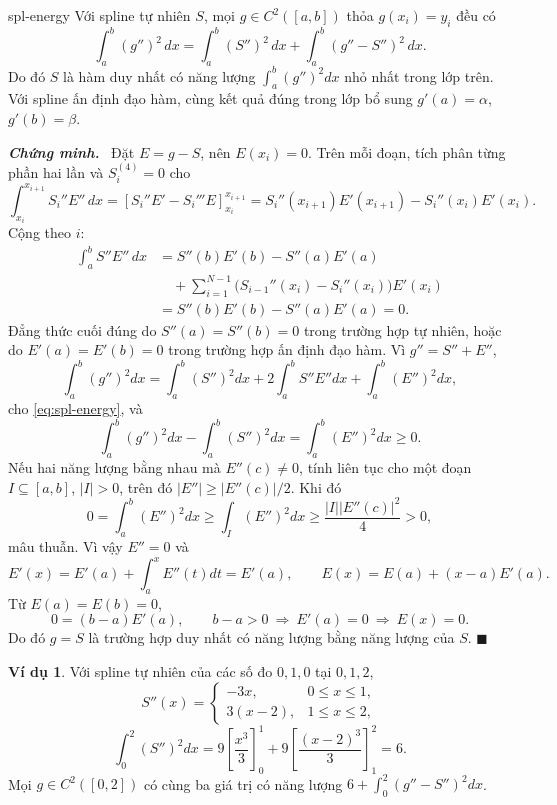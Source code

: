 \documentclass[12pt,a4paper,oneside]{book}
\numberwithin{algorithm}{chapter}
\theoremstyle{definition}
\newtheorem{vidu}{Ví dụ}[chapter]
\newenvironment{chungminh}{\par\medskip\noindent\textbf{\textit{\color{mainblue}Chứng minh.}}\ }{\hfill$\blacksquare$\par\medskip}
\begin{document}
\begin{dinhly}{}{spl-energy}
Với spline tự nhiên $S$, mọi $g\in C^2([a,b])$ thỏa $g(x_i)=y_i$ đều có
\begin{equation}\label{eq:spl-energy}
 \int_a^b(g'')^2\,dx
 =\int_a^b(S'')^2\,dx+\int_a^b(g''-S'')^2\,dx.
\end{equation}
Do đó $S$ là hàm duy nhất có năng lượng $\int_a^b(g'')^2dx$ nhỏ nhất trong lớp trên. Với spline ấn định đạo hàm, cùng kết quả đúng trong lớp bổ sung $g'(a)=\alpha$, $g'(b)=\beta$.
\end{dinhly}
\begin{chungminh}
Đặt $E=g-S$, nên $E(x_i)=0$. Trên mỗi đoạn, tích phân từng phần hai lần và $S_i^{(4)}=0$ cho
\[
 \int_{x_i}^{x_{i+1}}S_i''E''\,dx
 =[S_i''E'-S_i'''E]_{x_i}^{x_{i+1}}
 =S_i''(x_{i+1})E'(x_{i+1})-S_i''(x_i)E'(x_i).
\]
Cộng theo $i$:
\begin{align*}
 \int_a^bS''E''\,dx
 &=S''(b)E'(b)-S''(a)E'(a)\\
 &\quad+\sum_{i=1}^{N-1}
 \bigl(S_{i-1}''(x_i)-S_i''(x_i)\bigr)E'(x_i)\\
 &=S''(b)E'(b)-S''(a)E'(a)=0.
\end{align*}
Đẳng thức cuối đúng do $S''(a)=S''(b)=0$ trong trường hợp tự nhiên, hoặc do $E'(a)=E'(b)=0$ trong trường hợp ấn định đạo hàm. Vì $g''=S''+E''$,
\[
 \int_a^b(g'')^2dx=\int_a^b(S'')^2dx+2\int_a^bS''E''dx+\int_a^b(E'')^2dx,
\]
cho \eqref{eq:spl-energy}, và
\[
 \int_a^b(g'')^2dx-\int_a^b(S'')^2dx
 =\int_a^b(E'')^2dx\geq0.
\]
Nếu hai năng lượng bằng nhau mà $E''(c)\ne0$, tính liên tục cho một đoạn $I\subseteq[a,b]$, $|I|>0$, trên đó $|E''|\geq|E''(c)|/2$. Khi đó
\[
 0=\int_a^b(E'')^2dx
 \geq\int_I(E'')^2dx
 \geq\frac{|I||E''(c)|^2}4>0,
\]
mâu thuẫn. Vì vậy $E''=0$ và
\[
 E'(x)=E'(a)+\int_a^xE''(t)dt=E'(a),\qquad
 E(x)=E(a)+(x-a)E'(a).
\]
Từ $E(a)=E(b)=0$,
\[
 0=(b-a)E'(a),\qquad b-a>0
 \ \Longrightarrow\ E'(a)=0
 \ \Longrightarrow\ E(x)=0.
\]
Do đó $g=S$ là trường hợp duy nhất có năng lượng bằng năng lượng của $S$.
\end{chungminh}
\begin{vidu}
Với spline tự nhiên của các số đo $0,1,0$ tại $0,1,2$,
\[
 S''(x)=\begin{cases}-3x,&0\leq x\leq1,\\3(x-2),&1\leq x\leq2,\end{cases}
\]
\[
 \int_0^2(S'')^2dx=9\left[\frac{x^3}3\right]_0^1+9\left[\frac{(x-2)^3}3\right]_1^2=6.
\]
Mọi $g\in C^2([0,2])$ có cùng ba giá trị có năng lượng $6+\int_0^2(g''-S'')^2dx$.
\end{vidu}
\end{document}
